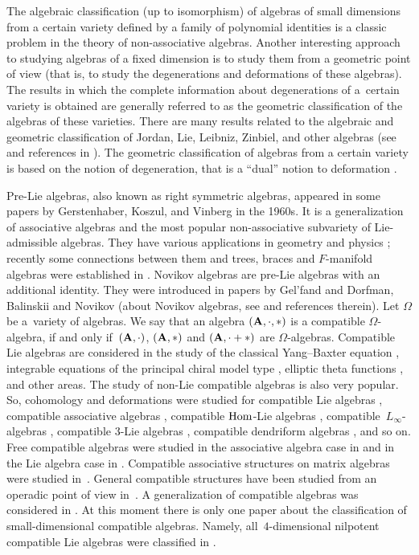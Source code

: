 \documentclass[pdftex]{sigma}
\numberwithin{equation}{section}
\begin{document}
The algebraic classification (up to isomorphism) of algebras of
small dimensions from a certain variety defined by a family of polynomial identities is a %
classic problem in the theory of non-associative algebras.
Another interesting approach to studying algebras of a fixed dimension is to study them from a geometric point of view (that is, to study the degenerations and deformations of these algebras). The results in which the complete information about degenerations of a~certain variety is obtained are generally referred to as the geometric classification of the algebras of these varieties. There are many results related to the algebraic and geometric classification of
Jordan, Lie, Leibniz, Zinbiel, and other algebras
(see \cite{abcf, fkkv, afm, BB09,BB14, EM22, BT22, GRH, KKL, KV, LLL} and references in \cite{k23,MS,l24}). The geometric classification of algebras from a certain variety is based on the notion of degeneration, that is a ``dual'' notion to deformation \cite{b,D23,EM22,HSZ,lsb20,c}.

Pre-Lie algebras, also known as right symmetric algebras,
appeared in some papers by Gerstenhaber, Koszul, and Vinberg in the 1960s.
It is a generalization of associative algebras and the most popular non-associative subvariety of Lie-admissible algebras.
They have various applications in geometry and physics \cite{B06};
recently some connections between them and trees, braces and $F$-manifold algebras were established in \cite{CL,lsb20, SS24,S22}.
Novikov algebras are pre-Lie algebras with an additional identity.
They were introduced in papers by
Gel'fand and Dorfman, Balinskii and Novikov (about Novikov algebras, see \cite{DIU} and references therein). Let $\Omega$ be a~variety of algebras.
 We say that an algebra $(\bf A, \cdot, \ast)$ is a compatible $\Omega$-algebra,
 if and only if~$(\bf A, \cdot)$, $(\bf A, \ast)$
and $(\bf A, \cdot + \ast)$ are $\Omega$-algebras.
Compatible Lie algebras are considered in the study of the classical Yang--Baxter equation \cite{GS06},
integrable equations of the principal chiral model type \cite{GS02},
elliptic theta functions \cite{OS04}, and other areas.
The study of non-Lie compatible algebras is also very popular.
So, cohomology and deformations were studied for
compatible Lie algebras \cite{lsb23},
compatible associative algebras \cite{CDM},
compatible ${\rm Hom}$-Lie algebras \cite{D23},
compatible~$L_{\infty}$-algebras \cite{D22},
compatible $3$-Lie algebras \cite{HSZ},
compatible dendriform algebras \cite{DSQ}, and so on.
Free compatible algebras were studied in the associative algebra case in \cite{D09} and
in the Lie algebra case in \cite{GR,l10}.
Compatible associative structures on matrix algebras were studied in~\cite{OS05,OS06,OS08}.
General compatible structures have been studied from an operadic point of view in~\cite{S08,zgg}.
A generalization of compatible algebras was considered in \cite{Khr}.
At this moment there is only one paper about the classification of small-dimensional compatible algebras.
Namely, all~$4$-dimensional nilpotent compatible Lie algebras were classified in \cite{LLL}.
\end{document}
